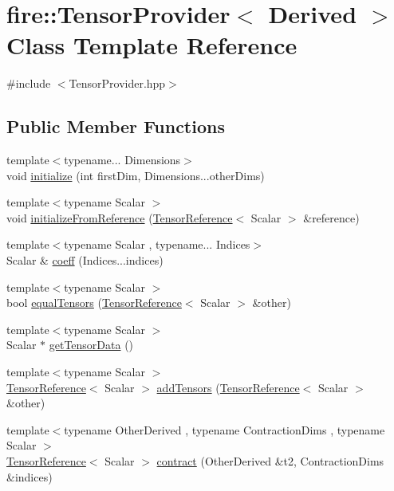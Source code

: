 \hypertarget{a00300}{}\section{fire\+:\+:Tensor\+Provider$<$ Derived $>$ Class Template Reference}
\label{a00300}


{\ttfamily \#include $<$Tensor\+Provider.\+hpp$>$}

\subsection*{Public Member Functions}
\begin{DoxyCompactItemize}
\item 
{\footnotesize template$<$typename... Dimensions$>$ }\\void \hyperlink{a00300_a7ad248537003c317ab3f4d319b4707ff}{initialize} (int first\+Dim, Dimensions...\+other\+Dims)
\item 
{\footnotesize template$<$typename Scalar $>$ }\\void \hyperlink{a00300_ab8f986a7fa520b2d9174091d2839356d}{initialize\+From\+Reference} (\hyperlink{a00822_a1bf491fd1c876e2808648b2fd291e3dd}{Tensor\+Reference}$<$ Scalar $>$ \&reference)
\item 
{\footnotesize template$<$typename Scalar , typename... Indices$>$ }\\Scalar \& \hyperlink{a00300_ad43be8da16d458ef4753c2a7e82e8ed1}{coeff} (Indices...\+indices)
\item 
{\footnotesize template$<$typename Scalar $>$ }\\bool \hyperlink{a00300_afa224b6dbf794f5a51d77fe126eb1d97}{equal\+Tensors} (\hyperlink{a00822_a1bf491fd1c876e2808648b2fd291e3dd}{Tensor\+Reference}$<$ Scalar $>$ \&other)
\item 
{\footnotesize template$<$typename Scalar $>$ }\\Scalar $\ast$ \hyperlink{a00300_a2a2de14154f8e814c813ec9b2ad60dfa}{get\+Tensor\+Data} ()
\item 
{\footnotesize template$<$typename Scalar $>$ }\\\hyperlink{a00822_a1bf491fd1c876e2808648b2fd291e3dd}{Tensor\+Reference}$<$ Scalar $>$ \hyperlink{a00300_a20324b2a35a2fa85a56907a239154cf0}{add\+Tensors} (\hyperlink{a00822_a1bf491fd1c876e2808648b2fd291e3dd}{Tensor\+Reference}$<$ Scalar $>$ \&other)
\item 
{\footnotesize template$<$typename Other\+Derived , typename Contraction\+Dims , typename Scalar $>$ }\\\hyperlink{a00822_a1bf491fd1c876e2808648b2fd291e3dd}{Tensor\+Reference}$<$ Scalar $>$ \hyperlink{a00300_ab725372d556f5c20cf3ae94ea788debe}{contract} (Other\+Derived \&t2, Contraction\+Dims \&indices)

\end{DoxyCompactItemize}

